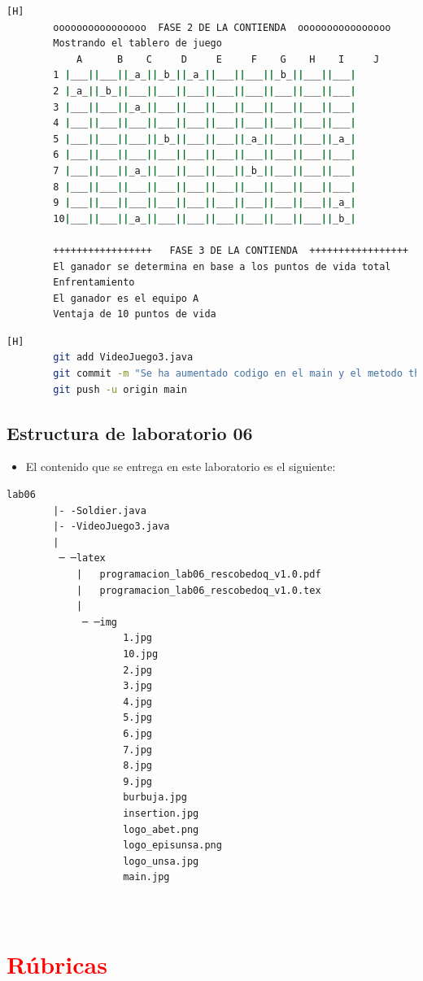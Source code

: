 \documentclass{article}
\begin{document}
\begin{lstlisting}[language=bash,caption={Compilando y probando el codigo en su versión final }][H]
		oooooooooooooooo  FASE 2 DE LA CONTIENDA  oooooooooooooooo
		Mostrando el tablero de juego
			A      B    C     D     E     F    G    H    I     J
		1 |___||___||_a_||_b_||_a_||___||___||_b_||___||___|
		2 |_a_||_b_||___||___||___||___||___||___||___||___|
		3 |___||___||_a_||___||___||___||___||___||___||___|
		4 |___||___||___||___||___||___||___||___||___||___|
		5 |___||___||___||_b_||___||___||_a_||___||___||_a_|
		6 |___||___||___||___||___||___||___||___||___||___|
		7 |___||___||_a_||___||___||___||_b_||___||___||___|
		8 |___||___||___||___||___||___||___||___||___||___|
		9 |___||___||___||___||___||___||___||___||___||_a_|
		10|___||___||_a_||___||___||___||___||___||___||_b_|
		
		+++++++++++++++++   FASE 3 DE LA CONTIENDA  +++++++++++++++++
		El ganador se determina en base a los puntos de vida total
		Enfrentamiento
		El ganador es el equipo A
		Ventaja de 10 puntos de vida
	\end{lstlisting}
	
	
	\begin{lstlisting}[language=bash,caption={Commit:Se ha aumentado codigo en el main y el metodo theWinner}][H]
		git add VideoJuego3.java
		git commit -m "Se ha aumentado codigo en el main y el metodo theWinner"			
		git push -u origin main
	\end{lstlisting}
	
	

	
	\subsection{Estructura de laboratorio 06}
	\begin{itemize}	
		\item El contenido que se entrega en este laboratorio es el siguiente:
	\end{itemize}
	
	\begin{lstlisting}[style=ascii-tree]
		lab06
		|- -Soldier.java
		|- -VideoJuego3.java
		|
		 ─ ─latex
			|   programacion_lab06_rescobedoq_v1.0.pdf
			|   programacion_lab06_rescobedoq_v1.0.tex
			|
			 ─ ─img
					1.jpg
					10.jpg
					2.jpg
					3.jpg
					4.jpg
					5.jpg
					6.jpg
					7.jpg
					8.jpg
					9.jpg
					burbuja.jpg
					insertion.jpg
					logo_abet.png
					logo_episunsa.png
					logo_unsa.jpg
					main.jpg
		
		
	\end{lstlisting}    
	
	\section{\textcolor{red}{Rúbricas}}
	
\end{document}
